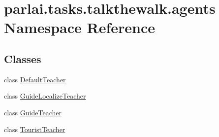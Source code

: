 \hypertarget{namespaceparlai_1_1tasks_1_1talkthewalk_1_1agents}{}\section{parlai.\+tasks.\+talkthewalk.\+agents Namespace Reference}
\label{namespaceparlai_1_1tasks_1_1talkthewalk_1_1agents}
\subsection*{Classes}
\begin{DoxyCompactItemize}
\item 
class \hyperlink{classparlai_1_1tasks_1_1talkthewalk_1_1agents_1_1DefaultTeacher}{Default\+Teacher}
\item 
class \hyperlink{classparlai_1_1tasks_1_1talkthewalk_1_1agents_1_1GuideLocalizeTeacher}{Guide\+Localize\+Teacher}
\item 
class \hyperlink{classparlai_1_1tasks_1_1talkthewalk_1_1agents_1_1GuideTeacher}{Guide\+Teacher}
\item 
class \hyperlink{classparlai_1_1tasks_1_1talkthewalk_1_1agents_1_1TouristTeacher}{Tourist\+Teacher}
\end{DoxyCompactItemize}
